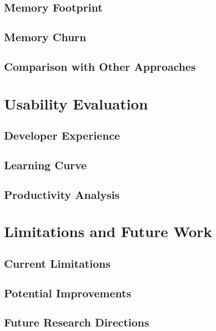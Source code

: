 \subsection{Memory Footprint}

\subsection{Memory Churn}

\subsection{Comparison with Other Approaches}

\section{Usability Evaluation}

\subsection{Developer Experience}

\subsection{Learning Curve}

\subsection{Productivity Analysis}

\section{Limitations and Future Work}

\subsection{Current Limitations}

\subsection{Potential Improvements}

\subsection{Future Research Directions} 